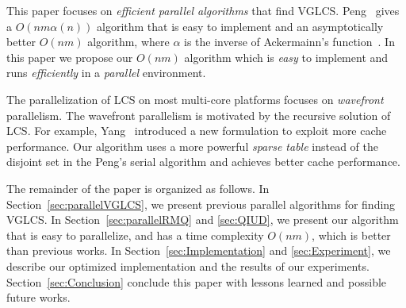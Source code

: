 This paper focuses on {\em efficient parallel algorithms} that find
VGLCS.  Peng~\cite{Peng2011TheLC} gives a $O(nm \alpha(n))$ algorithm
that is easy to implement and an asymptotically better $O(nm)$
algorithm, where $\alpha$ is the inverse of Ackermainn's
function~\cite{Banachowski1980ACT}.  In this paper we propose our
$O(nm)$ algorithm which is {\em easy} to implement and runs {\em
  efficiently} in a {\em parallel} environment.

The parallelization of LCS on most multi-core platforms focuses on
{\em wavefront} parallelism.  The wavefront parallelism is motivated
by the recursive solution of LCS.  For example,
Yang~\cite{Yang2010AnEP} introduced a new formulation to exploit more
cache performance.  Our algorithm uses a more powerful {\em sparse
  table} instead of the disjoint set in the Peng's serial algorithm
and achieves better cache performance.

The remainder of the paper is organized as follows.  In
Section~\ref{sec:parallelVGLCS}, we present previous parallel algorithms
for finding VGLCS.  In Section~\ref{sec:parallelRMQ} and \ref{sec:QIUD},
we present our algorithm that is easy to parallelize, and has a time
complexity $O(nm)$, which is better than previous works.  In
Section~\ref{sec:Implementation} and \ref{sec:Experiment}, we describe
our optimized implementation and the results of our experiments.
Section~\ref{sec:Conclusion} conclude this paper with lessons learned
and possible future works.

